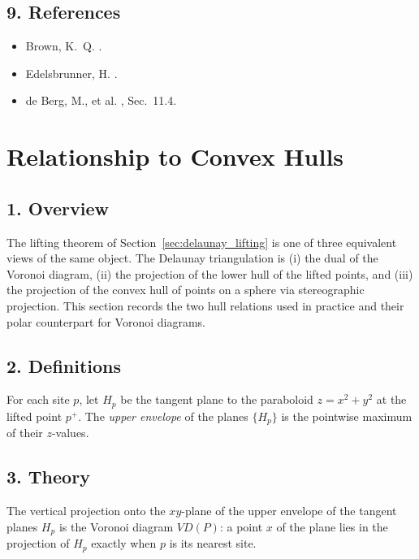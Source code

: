 \subsection{9. References}

\begin{itemize}
\item Brown, K.~Q. \cite{brown1979}.
\item Edelsbrunner, H. \cite{edelsbrunner1987}.
\item de Berg, M., et al. \cite{deberg2008}, Sec.~11.4.
\end{itemize}

\section{Relationship to Convex Hulls}
\label{sec:delaunay_convex_hulls}

\subsection{1. Overview}

The lifting theorem of Section~\ref{sec:delaunay_lifting} is one of three
equivalent views of the same object. The Delaunay triangulation is (i) the dual
of the Voronoi diagram, (ii) the projection of the lower hull of the lifted
points, and (iii) the projection of the convex hull of points on a sphere via
stereographic projection. This section records the two hull relations used in
practice and their polar counterpart for Voronoi diagrams.

\subsection{2. Definitions}

\begin{definition}\label{def:lifting_upper_envelope}
For each site $p$, let $H_p$ be the tangent plane to the paraboloid
$z = x^2 + y^2$ at the lifted point $p^+$. The \emph{upper envelope} of the
planes $\{H_p\}$ is the pointwise maximum of their $z$-values.
\end{definition}

\subsection{3. Theory}

\begin{theorem}\label{thm:voronoi_upper_hull}
The vertical projection onto the $xy$-plane of the upper envelope of the
tangent planes $H_p$ is the Voronoi diagram $VD(P)$: a point $x$ of the plane
lies in the projection of $H_p$ exactly when $p$ is its nearest site.
\end{theorem}

